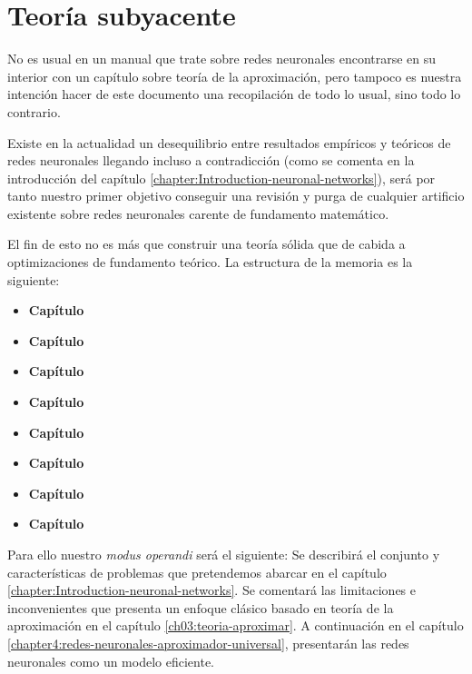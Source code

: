 
\part{Teoría subyacente}

No es usual en un manual que trate sobre redes neuronales encontrarse en su interior con un 
capítulo sobre teoría de la aproximación, pero tampoco es nuestra intención
hacer de este documento una recopilación de todo lo usual, sino todo lo contrario.

Existe en la actualidad un desequilibrio entre resultados empíricos y teóricos de redes neuronales llegando incluso a contradicción (como se comenta en la introducción del capítulo \ref{chapter:Introduction-neuronal-networks}), será por tanto
nuestro primer objetivo conseguir una revisión y purga de cualquier artificio existente sobre redes neuronales carente de fundamento matemático. 

El fin de esto no es más que construir una teoría sólida que de cabida a 
optimizaciones de fundamento teórico. La estructura de la memoria es la siguiente: 

\begin{itemize}
    \item \textbf{Capítulo }
    \item \textbf{Capítulo }
    \item \textbf{Capítulo }
    \item \textbf{Capítulo }
    \item \textbf{Capítulo }
    \item \textbf{Capítulo }
    \item \textbf{Capítulo }
    \item \textbf{Capítulo }
\end{itemize}


Para ello nuestro \textit{modus operandi} será el siguiente: 
Se describirá el conjunto y características de problemas que pretendemos abarcar  en el capítulo \ref{chapter:Introduction-neuronal-networks}. 
Se comentará las limitaciones e inconvenientes que presenta un enfoque clásico 
basado en teoría de la aproximación en el capítulo \ref{ch03:teoria-aproximar}.
A continuación en el capítulo \ref{chapter4:redes-neuronales-aproximador-universal}, 
presentarán las redes neuronales como un modelo eficiente.
 
